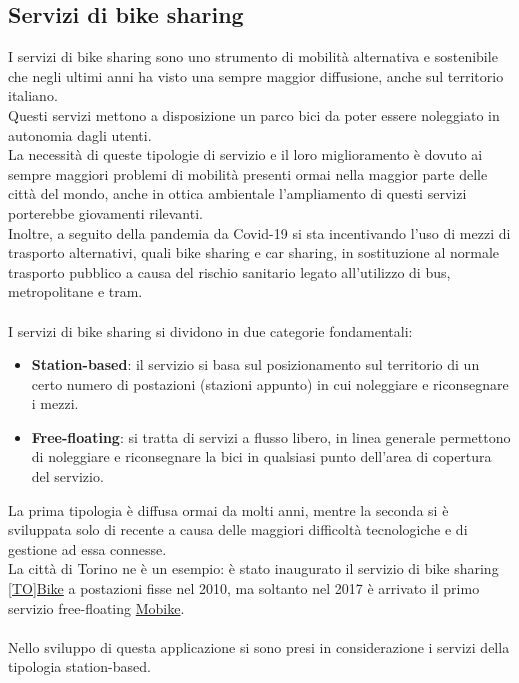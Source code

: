 \documentclass[a4paper, 12pt]{article}
\begin{document}
	\subsection{Servizi di bike sharing}

	I servizi di bike sharing sono uno strumento di mobilità alternativa e sostenibile che negli ultimi anni ha visto una sempre maggior diffusione, anche sul territorio italiano.\\
	Questi servizi mettono a disposizione un parco bici da poter essere noleggiato in autonomia dagli utenti. \\
	La necessità di queste tipologie di servizio e il loro miglioramento è dovuto ai sempre maggiori problemi di mobilità presenti ormai nella maggior parte delle città del mondo, anche in ottica ambientale l'ampliamento di questi servizi porterebbe giovamenti rilevanti. \\Inoltre, a seguito della pandemia da Covid-19 si sta incentivando l'uso di mezzi di trasporto alternativi, quali bike sharing e car sharing, in sostituzione al normale trasporto pubblico a causa del rischio sanitario legato all'utilizzo di bus, metropolitane e tram.\\\\
	I servizi di bike sharing si dividono in due categorie fondamentali: 
	\begin{itemize}
		\item \textbf{Station-based}: il servizio si basa sul posizionamento sul territorio di un certo numero di postazioni (stazioni appunto) in cui noleggiare e riconsegnare i mezzi.
		\item \textbf{Free-floating}: si tratta di servizi a flusso libero, in linea generale permettono di noleggiare e riconsegnare la bici in qualsiasi punto dell'area di copertura del servizio.
	\end{itemize}
La prima tipologia è diffusa ormai da molti anni, mentre la seconda si è sviluppata solo di recente a causa delle maggiori difficoltà tecnologiche e di gestione ad essa connesse.\\
La città di Torino ne è un esempio: è stato inaugurato il servizio di bike sharing \href{http://www.tobike.it/default.aspx}{[TO]Bike} a postazioni fisse nel 2010, ma soltanto nel 2017 è arrivato il primo servizio free-floating \href{https://mobike.com/global/}{Mobike}.\\\\
Nello sviluppo di questa applicazione si sono presi in considerazione i servizi della tipologia station-based.
\end{document}
